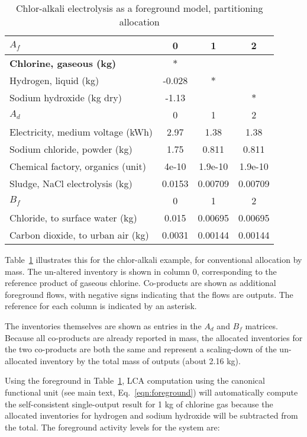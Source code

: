 \begin{table}
  \begin{center}
  \caption{Chlor-alkali electrolysis as a foreground model, partitioning allocation}
  \label{tbl:partition}
  \footnotesize\sffamily
  \begin{tabular}{l|ccc}
    \midrule
    \bf $A_f$ & 0 & 1 & 2 \\
    \midrule
    \textbf{Chlorine, gaseous (kg)} & $\ast$ & & \\
    Hydrogen, liquid (kg) & -0.028 & $\ast$ & \\
    Sodium hydroxide (kg dry) & -1.13 & & $\ast$ \\
    \midrule
    \bf $A_d$ & 0 & 1 & 2 \\
    \midrule
    Electricity, medium voltage (kWh) & 2.97 & 1.38 & 1.38 \\
    Sodium chloride, powder (kg) & 1.75 & 0.811 & 0.811 \\
    Chemical factory, organics (unit) & 4e-10 & 1.9e-10 & 1.9e-10 \\
    Sludge, NaCl electrolysis (kg) & 0.0153 & 0.00709 & 0.00709 \\
    \midrule
    \bf $B_f$ & 0 & 1 & 2 \\
    \midrule
    Chloride, to surface water (kg) & 0.015 & 0.00695 & 0.00695 \\
    Carbon dioxide, to urban air (kg) & 0.0031 & 0.00144 & 0.00144 \\
    \midrule
  \end{tabular}
  \end{center}
\end{table}
    

Table~\ref{tbl:partition} illustrates this for the chlor-alkali example, for conventional allocation by mass.  The un-altered inventory is shown in column $0$, corresponding to the reference product of gaseous chlorine.  Co-products are shown as additional foreground flows, with negative signs indicating that the flows are outputs.  The reference for each column is indicated by an asterisk.

The inventories themselves are shown as entries in the $A_d$ and $B_f$ matrices. Because all co-products are already reported in mass, the allocated inventories for the two co-products are both the same and represent a scaling-down of the un-allocated inventory by the total mass of outputs (about 2.16 kg).

Using the foreground in Table~\ref{tbl:partition}, LCA computation using the canonical functional unit (see main text, Eq.~\ref{eqn:foreground}) will automatically compute the self-consistent single-output result for 1 kg of chlorine gas because the allocated inventories for hydrogen and sodium hydroxide will be subtracted from the total.  The foreground activity levels for the system are:


